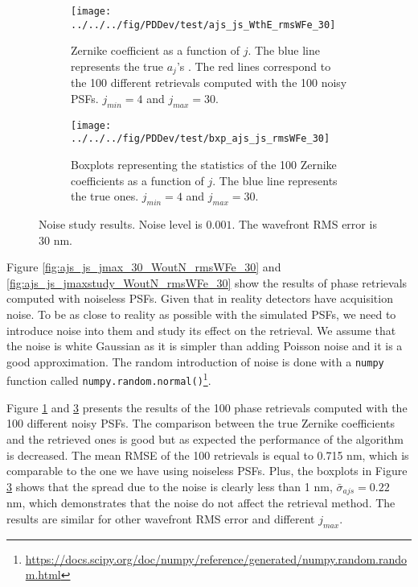 \begin{figure}
\centering
    \begin{subfigure}{0.45\textwidth}
        \texttt{[image: ../../../fig/PDDev/test/ajs\_js\_WthE\_rmsWFe\_30]}
        \caption{Zernike coefficient as a function of $j$.  The blue line represents the true $a_j$'s . The red lines correspond to the 100 different retrievals computed with the 100 noisy PSFs. $j_{min}=4$ and $j_{max}=30$.}
        \label{subfig:ajs_js_WthE_rmsWFe_30}
    \end{subfigure}
    \quad
    \begin{subfigure}{0.45\textwidth}
        \texttt{[image: ../../../fig/PDDev/test/bxp\_ajs\_js\_rmsWFe\_30]}
        \caption{Boxplots representing the statistics of the 100 Zernike coefficients as a function of $j$. The blue line represents the true ones. $j_{min}=4$ and $j_{max}=30$.}
        \label{subfig:bxp_ajs_js_rmsWFe_30}
    \end{subfigure}
    \decoRule
    \caption{Noise study results. Noise level is $0.001$. The wavefront RMS error is 30 nm.}
\end{figure}

Figure \ref{fig:ajs_js_jmax_30_WoutN_rmsWFe_30} and \ref{fig:ajs_js_jmaxstudy_WoutN_rmsWFe_30} show the results of phase retrievals computed with noiseless PSFs. Given that in reality detectors have acquisition noise. To be as close to reality as possible with the simulated PSFs, we need to introduce noise into them and study its effect on the retrieval. We assume that the noise is white Gaussian as it is simpler than adding Poisson noise and it is a good approximation. The random introduction of noise is done with a \verb!numpy! function called \verb!numpy.random.normal()!\footnote{\url{https://docs.scipy.org/doc/numpy/reference/generated/numpy.random.random.html}}.

Figure \ref{subfig:ajs_js_WthE_rmsWFe_30} and \ref{subfig:bxp_ajs_js_rmsWFe_30} presents the results of the 100 phase retrievals computed with the 100 different noisy PSFs. The comparison between the true Zernike coefficients and the retrieved ones is good but as expected the performance of the algorithm is decreased. The mean RMSE of the 100 retrievals is equal to 0.715 nm, which is comparable to the one we have using noiseless PSFs. Plus, the boxplots in Figure \ref{subfig:bxp_ajs_js_rmsWFe_30} shows that the spread due to the noise is clearly less than 1 nm, $\bar{\sigma}_{ajs} = 0.22$ nm, which demonstrates that the noise do not affect the retrieval method. The results are similar for other wavefront RMS error and different $j_{max}$.

